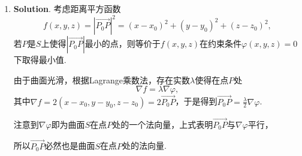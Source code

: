 \documentclass[../main.tex]{subfiles}
\begin{document}
\begin{enumerate}
          考察
          \[
              \lim_{\substack{x\to 0 \\ y\to 0}}\frac{f(x,y)-f(0,0)-f_{x}(0,0)x-f_{y}(0,0)y}{\sqrt{x^{2}+y^{2}}}
              = \lim_{\substack{x\to 0 \\ y\to 0}}\frac{\sqrt{|xy|}\sin\left(x^{2}+y^{2}\right)}{\left(x^{2}+y^{2}\right)\sqrt{x^2+y^2}}.
          \]

          当$y=x,x\to0,y\to0$时，
          \[
              \lim_{\substack{x\to 0 \\ y\to 0}}\sqrt{\frac{|xy|}{x^{2}+y^{2}}}
              = \lim_{x\to0}\sqrt{\frac{x^{2}}{2x^{2}}}= \frac{\sqrt{2}}{2},
          \]
          所以$\lim_{\substack{x\to 0 \\ y\to 0}}
              \frac{\sqrt{|xy|}\sin\left(x^{2}+y^{2}\right)}{\left(x^{2}+y^{2}\right)\sqrt{x^2+y^2}}
              \neq 0$，函数$f(x,y)$在原点处不可微.

    \item \textbf{Solution}. 考虑距离平方函数
          \[
              f(x,y,z) = \left|\overrightarrow{P_0P}\right|^{2} = (x-x_{0})^{2}+(y-y_{0}
              )^{2}+(z-z_{0})^{2},
          \]
          若$P$是$S$上使得$\left|\overrightarrow{P_0P}\right|$最小的点，则等价于$f(x,
              y,z)$在约束条件$\varphi(x,y,z)=0$下取得最小值.

          由于曲面光滑，根据Lagrange乘数法，存在实数$\lambda$使得在点$P$处
          \[
              \nabla f = \lambda \nabla \varphi,
          \]
          其中$\nabla f = 2(x-x_{0}, y-y_{0}, z-z_{0})=2\overrightarrow{P_0P}$，于是得到$\overrightarrow
              {P_0P}= \frac{\lambda}{2}\nabla \varphi$.

          注意到$\nabla \varphi$即为曲面$S$在点$P$处的一个法向量，上式表明$\overrightarrow
              {P_0P}$与$\nabla \varphi$平行，

          所以$\overrightarrow{P_0P}$必然也是曲面$S$在点$P$处的法向量.

\end{enumerate}
\end{document}
